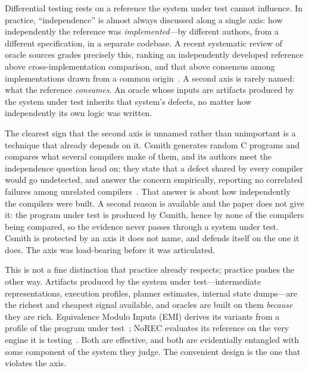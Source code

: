 Differential testing rests on a reference the system under test cannot influence.
In practice, ``independence'' is almost always discussed along a single axis: how
independently the reference was \emph{implemented}---by different authors, from a
different specification, in a separate codebase. A recent systematic review of
oracle sources grades precisely this, ranking an independently developed reference
above cross-implementation comparison, and that above consensus among
implementations drawn from a common origin~\cite{oraclesurvey2026}. A second axis
is rarely named: what the reference \emph{consumes}. An oracle whose inputs are
artifacts produced by the system under test inherits that system's defects, no
matter how independently its own logic was written.

The clearest sign that the second axis is unnamed rather than unimportant is a
technique that already depends on it. Csmith generates random C programs and compares
what several compilers make of them, and its authors meet the independence question
head on: they state that a defect shared by every compiler would go undetected, and
answer the concern empirically, reporting no correlated failures among unrelated
compilers~\cite{yang2011csmith}. That answer is about how independently the compilers
were built. A second reason is available and the paper does not give it: the program
under test is produced by Csmith, hence by none of the compilers being compared, so
the evidence never passes through a system under test. Csmith is protected by an axis
it does not name, and defends itself on the one it does. The axis was load-bearing
before it was articulated.

This is not a fine distinction that practice already respects; practice pushes the
other way. Artifacts produced by the system under test---intermediate
representations, execution profiles, planner estimates, internal state dumps---are
the richest and cheapest signal available, and oracles are built on them
\emph{because} they are rich. Equivalence Modulo Inputs (EMI) derives its variants from a
profile of the program under test~\cite{le2014emi}; NoREC evaluates its reference on
the very engine it is testing~\cite{rigger2020norec}. Both are effective, and both
are evidentially entangled with some component of the system they judge. The
convenient design is the one that violates the axis.

